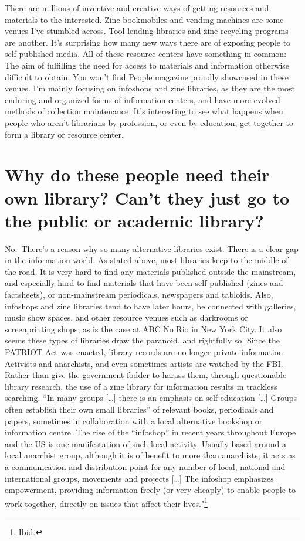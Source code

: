 \documentclass[output=paper]{langscibook}
\begin{document}
There are millions of inventive and creative ways of getting resources
and materials to the interested. Zine bookmobiles and vending machines
are some venues I've stumbled across. Tool lending libraries and zine
recycling programs are another. It's surprising how many new ways there
are of exposing people to self-published media. All of these resource
centers have something in common: The aim of fulfilling the need for
access to materials and information otherwise difficult to obtain. You
won't find People magazine proudly showcased in these venues. I'm mainly
focusing on infoshops and zine libraries, as they are the most enduring
and organized forms of information centers, and have more evolved
methods of collection maintenance. It's interesting to see what happens
when people who aren't librarians by profession, or even by education,
get together to form a library or resource center.

\hypertarget{why-do-these-people-need-their-own-library-cant-they-just-go-to-the-public-or-academic-library}{%
\section*{Why do these people need their own library? Can't they just go
to the public or academic
library?}\label{why-do-these-people-need-their-own-library-cant-they-just-go-to-the-public-or-academic-library}}

No.~There's a reason why so many alternative libraries exist. There is a
clear gap in the information world. As stated above, most libraries keep
to the middle of the road. It is very hard to find any materials
published outside the mainstream, and especially hard to find materials
that have been self-published (zines and factsheets), or non-mainstream
periodicals, newspapers and tabloids. Also, infoshops and zine libraries
tend to have later hours, be connected with galleries, music show
spaces, and other resource venues such as darkrooms or screenprinting
shops, as is the case at ABC No Rio in New York City. It also seems
these types of libraries draw the paranoid, and rightfully so. Since the
PATRIOT Act was enacted, library records are no longer private
information. Activists and anarchists, and even sometimes artists are
watched by the FBI. Rather than give the government fodder to harass
them, through questionable library research, the use of a zine library
for information results in trackless searching. \foreignquote{english}{In many groups
{[}\ldots{]} there is an emphasis on self-education {[}\ldots{]} Groups
often establish their own small libraries} of relevant books,
periodicals and papers, sometimes in collaboration with a local
alternative bookshop or information centre. The rise of the
\foreignquote{english}{infoshop} in recent years throughout Europe and the US is one
manifestation of such local activity. Usually based around a local
anarchist group, although it is of benefit to more than anarchists, it
acts as a communication and distribution point for any number of local,
national and international groups, movements and projects {[}\ldots{]}
The infoshop emphasizes empowerment, providing information freely (or
very cheaply) to enable people to work together, directly on issues that
affect their lives."\footnote{Ibid.}
\end{document}
